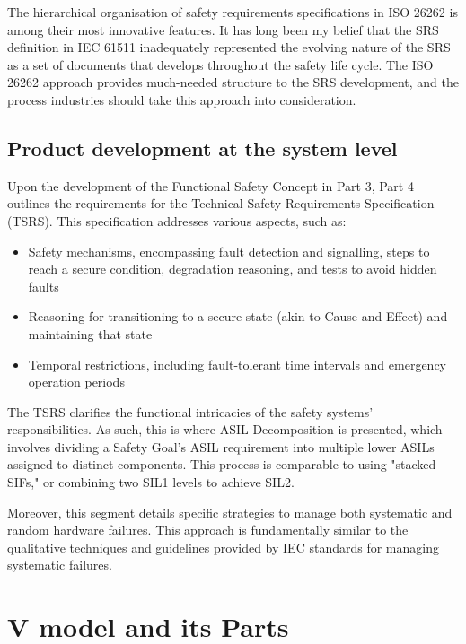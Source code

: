 \documentclass[./dissertation.tex]{subfiles}
\begin{document}
The hierarchical organisation of safety requirements specifications in ISO 26262 is among their most innovative features. It has long been my belief that the SRS definition in IEC 61511 inadequately represented the evolving nature of the SRS as a set of documents that develops throughout the safety life cycle. The ISO 26262 approach provides much-needed structure to the SRS development, and the process industries should take this approach into consideration.




\subsection{Product development at the system level}
Upon the development of the Functional Safety Concept in Part 3, Part 4 outlines the requirements for the Technical Safety Requirements Specification (TSRS). This specification addresses various aspects, such as:

\begin{itemize}
\item Safety mechanisms, encompassing fault detection and signalling, steps to reach a secure condition, degradation reasoning, and tests to avoid hidden faults
\item Reasoning for transitioning to a secure state (akin to Cause and Effect) and maintaining that state
\item Temporal restrictions, including fault-tolerant time intervals and emergency operation periods
\end{itemize}

The TSRS clarifies the functional intricacies of the safety systems' responsibilities. As such, this is where ASIL Decomposition is presented, which involves dividing a Safety Goal's ASIL requirement into multiple lower ASILs assigned to distinct components. This process is comparable to using "stacked SIFs," or combining two SIL1 levels to achieve SIL2.

Moreover, this segment details specific strategies to manage both systematic and random hardware failures. This approach is fundamentally similar to the qualitative techniques and guidelines provided by IEC standards for managing systematic failures.


\section {V model and its Parts}
\end{document}

